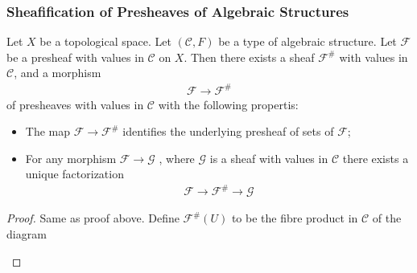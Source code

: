 \documentclass[Total.tex]{subfiles}
\begin{document}
				\subsubsection{Sheafification of Presheaves of Algebraic Structures}
				\begin{lemma}
					Let $X$ be a topological space. Let $(\mathcal{C},F)$ be a type of algebraic structure. Let $\mathcal{F}$ be a presheaf with values in $\mathcal{C}$ on $X$. Then there exists a sheaf $\mathcal{F}^\#$ with values in $\mathcal{C}$, and a morphism
					\begin{gather*}
						\mathcal{F}\rightarrow \mathcal{F}^\#
					\end{gather*}
					of presheaves with values in $\mathcal{C}$ with the following propertis:
					\begin{itemize}
						\item The map $\mathcal{F}\rightarrow \mathcal{F}^\#$ identifies the underlying presheaf of sets of $\mathcal{F}$;
						\item For any morphism $\mathcal{F}\rightarrow \mathcal{G}$ , where $\mathcal{G}$ is a sheaf with values in $\mathcal{C}$ there exists a unique factorization
						\begin{gather*}
							\mathcal{F}\rightarrow \mathcal{F}^\#\rightarrow \mathcal{G}
						\end{gather*}
					\end{itemize}
				\end{lemma}
				\begin{proof}
					Same as proof above. Define $\mathcal{F}^\#(U)$ to be the fibre product in $\mathcal{C}$ of the diagram
					\begin{center}
					\end{center}
				\end{proof}
				
\end{document}

